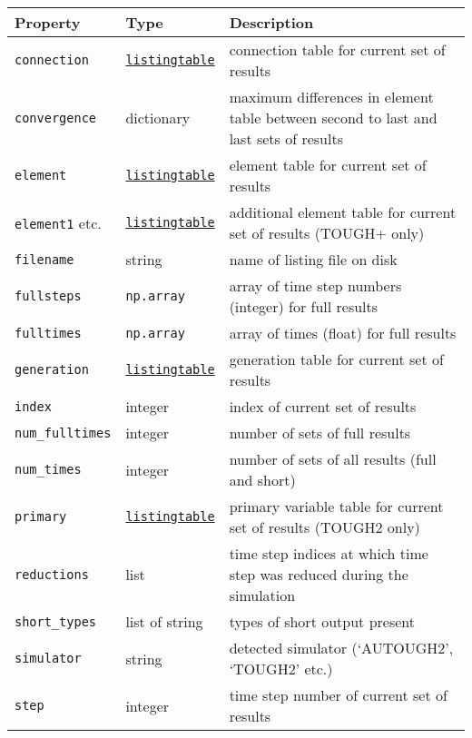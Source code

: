 \begin{table}
  \begin{center}
    \begin{tabular}{|l|l|p{70mm}|}
      \hline
      \textbf{Property} & \textbf{Type} & \textbf{Description}\\
      \hline
      \texttt{connection} & \hyperref[listingtableobjects]{\texttt{listingtable}} & connection table for current set of results\\
      \texttt{convergence} & dictionary & maximum differences in element table between second to last and last sets of results\\
      \texttt{element} & \hyperref[listingtableobjects]{\texttt{listingtable}} & element table for current set of results\\
      \texttt{element1} etc. & \hyperref[listingtableobjects]{\texttt{listingtable}} & additional element table for current set of results (TOUGH+ only)\\
      \texttt{filename} & string & name of listing file on disk\\
      \texttt{fullsteps} & \texttt{np.array} & array of time step numbers (integer) for full results\\
      \texttt{fulltimes} & \texttt{np.array} & array of times (float) for full results\\
      \texttt{generation} & \hyperref[listingtableobjects]{\texttt{listingtable}} & generation table for current set of results\\
      \texttt{index} & integer & index of current set of results\\
      \texttt{num\_fulltimes} & integer & number of sets of full results\\
      \texttt{num\_times} & integer & number of sets of all results (full and short)\\
      \texttt{primary} & \hyperref[listingtableobjects]{\texttt{listingtable}} & primary variable table for current set of results (TOUGH2 only)\\
      \texttt{reductions} & list & time step indices at which time step was reduced during the simulation\\
      \texttt{short\_types} & list of string & types of short output present\\
      \texttt{simulator} & string & detected simulator (`AUTOUGH2', `TOUGH2' etc.)\\
      \texttt{step} & integer & time step number of current set of results\\

\end{tabular}
\end{center}
\end{table}
